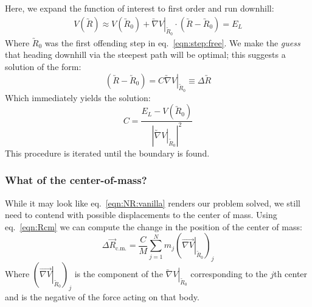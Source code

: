 \documentclass[letter,11pt]{article}
\newcommand{\cvec}[1]{\utilde{#1}}
\newcommand{\svec}[1]{\vec{#1}}
\newcommand{\laeq}[1]{\label{eqn:#1}}
\newcommand{\refeq}[1]{eq.~\ref{eqn:#1}}
\newcommand{\Rcm}{\svec{R}_{\textrm{c.m.}}}
\begin{document}
Here, we expand the function of interest to first order and run downhill:
\begin{align}\laeq{expansion}
  V(\cvec{R}) \approx  V(\cvec{R}_0) + \left. \cvec{\nabla}V\right|_{\cvec{R}_0} \cdot (\cvec{R} - \cvec{R}_0) = E_L
\end{align}
Where $\cvec{R}_0$ was the first offending step in \refeq{step:free}. We make the \emph{guess} that heading downhill via the steepest path will be optimal; this suggests a solution of the form:
\begin{equation}\laeq{NR:vanilla}
  (\cvec{R} - \cvec{R}_0) = C \left. \cvec{\nabla} V\right|_{\cvec{R}_0} \equiv \Delta\cvec{R}
\end{equation}
Which immediately yields the solution:
\[
  C = \frac{E_L - V(\cvec{R}_0)}{{\left| \left. \cvec{\nabla} V\right|_{\cvec{R}_0} \right|}^2}
\]
This procedure is iterated until the boundary is found.

\subsubsection{What of the center-of-mass?}
While it may look like \refeq{NR:vanilla} renders our problem solved, we still need to contend with possible displacements to the center of mass. Using \refeq{Rcm} we can compute the change in the position of the center of mass:
\begin{equation}\laeq{deltaRcm}
  \Delta\Rcm = \frac{C}{M} \sum_{j=1}^N m_j {\left(\left. \overrightarrow{\nabla V} \right|_{\cvec{R}_0} \right)}_j %
\end{equation}
Where ${\left(\left. \overrightarrow{\nabla V} \right|_{\cvec{R}_0} \right)}_j$ is the component of the $\left. \cvec{\nabla} V \right|_{\cvec{R}_0}$ corresponding to the $j$th center and is the negative of the force acting on that body.
\end{document}
